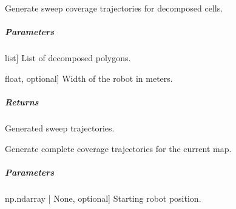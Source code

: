 \documentclass[letterpaper,10pt,english]{sphinxmanual}
\begin{document}
\begin{fulllineitems}
\begin{fulllineitems}
\begin{description}
\end{description}

\end{fulllineitems}


\begin{fulllineitems}
\label{\detokenize{mirte_lc_nav2.navigators:mirte_lc_nav2.navigators.BousPath.bous_path}}
\pysigstartsignatures
\pysiglinewithargsret
{}
{\sphinxparamcomma {}}
{}
\pysigstopsignatures
\sphinxAtStartPar
Generate sweep coverage trajectories for decomposed cells.


\subparagraph{Parameters}
\label{\detokenize{mirte_lc_nav2.navigators:id1}}\begin{description}
\sphinxlineitem{cells}{[}list{]}
\sphinxAtStartPar
List of decomposed polygons.

\sphinxlineitem{robot\_width}{[}float, optional{]}
\sphinxAtStartPar
Width of the robot in meters.

\end{description}


\subparagraph{Returns}
\label{\detokenize{mirte_lc_nav2.navigators:id2}}\begin{description}
\sphinxAtStartPar
Generated sweep trajectories.

\end{description}

\end{fulllineitems}


\begin{fulllineitems}
\label{\detokenize{mirte_lc_nav2.navigators:mirte_lc_nav2.navigators.BousPath.generate_path}}
\pysigstartsignatures
\pysiglinewithargsret
{}
{}
{}
\pysigstopsignatures
\sphinxAtStartPar
Generate complete coverage trajectories for the current map.


\subparagraph{Parameters}
\label{\detokenize{mirte_lc_nav2.navigators:id3}}\begin{description}
\sphinxlineitem{start}{[}np.ndarray | None, optional{]}
\sphinxAtStartPar
Starting robot position.


\end{description}
\end{fulllineitems}
\end{fulllineitems}
\end{document}
